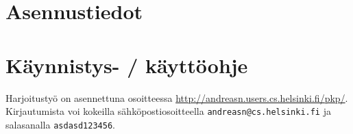 \documentclass[a4paper,12pt, titlepage]{article}
\begin{document}
\section{Asennustiedot}

\section{Käynnistys- / käyttöohje}

Harjoitustyö on asennettuna osoitteessa \url{http://andreasn.users.cs.helsinki.fi/pkp/}.
Kirjautumista voi kokeilla sähköpostiosoitteella \verb|andreasn@cs.helsinki.fi|
ja salasanalla \verb|asdasd123456|.
\end{document}
